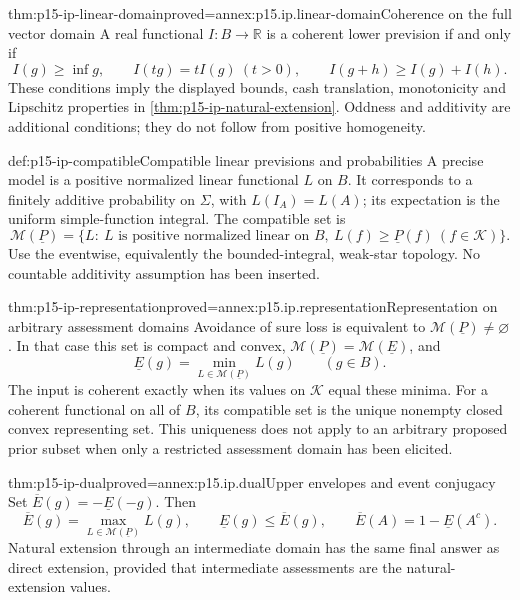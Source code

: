 \begin{hbtheorem}{thm:p15-ip-linear-domain}{proved=annex:p15.ip.linear-domain}{Coherence on the full vector domain}
A real functional \(I:B\to\mathbb R\) is a coherent lower prevision
if and only if
\[
 I(g)\geq\inf g,\qquad I(tg)=tI(g)\ (t>0),\qquad
 I(g+h)\geq I(g)+I(h).
\]
These conditions imply the displayed bounds, cash translation, monotonicity
and Lipschitz properties in \cref{thm:p15-ip-natural-extension}.
Oddness and additivity are additional
conditions; they do not follow from positive homogeneity.
\end{hbtheorem}

\begin{hbdefinition}{def:p15-ip-compatible}{Compatible linear previsions and probabilities}
A precise model is a positive normalized linear functional \(L\) on \(B\).
It corresponds to a finitely additive probability on \(\Sigma\), with
\(L(I_A)=L(A)\); its expectation is the uniform simple-function integral.
The compatible set is
\[
 \mathcal M(\underline P)=
 \{L:\ L\text{ is positive normalized linear on }B,
                   \ L(f)\geq\underline P(f)\ (f\in\mathcal K)\}.
\]
Use the eventwise, equivalently the bounded-integral, weak-star topology.
No countable additivity assumption has been inserted.
\end{hbdefinition}

\begin{hbtheorem}{thm:p15-ip-representation}{proved=annex:p15.ip.representation}{Representation on arbitrary assessment domains}
Avoidance of sure loss is equivalent to
\(\mathcal M(\underline P)\ne\varnothing\). In that case this set is
compact and convex, \(\mathcal M(\underline P)=\mathcal M(\underline E)\),
and
\[
 \underline E(g)=\min_{L\in\mathcal M(\underline P)}L(g)\qquad(g\in B).
\]
The input is coherent exactly when its values on \(\mathcal K\) equal
these minima. For a coherent functional on all of \(B\), its compatible
set is the unique nonempty closed convex representing set. This uniqueness
does not apply to an arbitrary proposed prior subset when only a restricted
assessment domain has been elicited.
\end{hbtheorem}

\begin{hbcorollary}{thm:p15-ip-dual}{proved=annex:p15.ip.dual}{Upper envelopes and event conjugacy}
Set \(\overline E(g)=-\underline E(-g)\). Then
\[
 \overline E(g)=\max_{L\in\mathcal M(\underline P)}L(g),\qquad
 \underline E(g)\leq\overline E(g),\qquad
 \overline E(A)=1-\underline E(A^c).
\]
Natural extension through an intermediate domain has the same final
answer as direct extension, provided that intermediate assessments are
the natural-extension values.
\end{hbcorollary}

